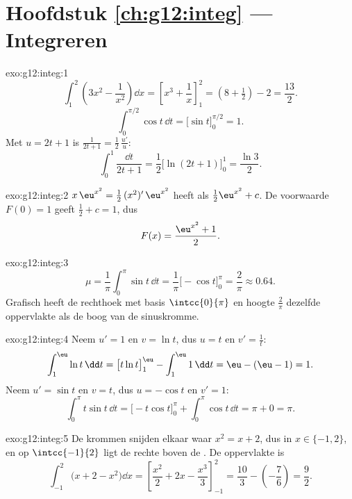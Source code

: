 \section*{Hoofdstuk \ref{ch:g12:integ} --- Integreren}

\begin{solution}{exo:g12:integ:1}
\[
\int_1^2 \left(3x^2 - \frac{1}{x^2}\right)\dd x
= \left[x^3 + \frac1x\right]_1^2 = \left(8 + \tfrac12\right) - 2 = \frac{13}{2}.
\]
\[
\int_0^{\pi/2} \cos t\,\dd t = \bigl[\sin t\bigr]_0^{\pi/2} = 1 .
\]
Met $u = 2t+1$ is $\frac{1}{2t+1} = \frac12\,\frac{u'}{u}$:
\[
\int_0^1 \frac{\dd t}{2t+1} = \frac12\bigl[\ln(2t+1)\bigr]_0^1
= \frac{\ln 3}{2}.
\]
\end{solution}

\begin{solution}{exo:g12:integ:2}
$x\,\eu^{x^2} = \frac12\,(x^2)'\,\eu^{x^2}$ heeft als 
$\frac12\eu^{x^2} + c$. De voorwaarde $F(0) = 1$ geeft $\frac12 + c = 1$,
dus
\[
F(x) = \frac{\eu^{x^2} + 1}{2}.
\]
\end{solution}

\begin{solution}{exo:g12:integ:3}
\[
\mu = \frac{1}{\pi}\int_0^\pi \sin t\,\dd t
= \frac{1}{\pi}\bigl[-\cos t\bigr]_0^\pi = \frac{2}{\pi} \approx 0.64 .
\]
Grafisch heeft de rechthoek met basis $\intcc{0}{\pi}$ en hoogte
$\frac{2}{\pi}$ dezelfde oppervlakte als de boog van de sinuskromme.
\end{solution}

\begin{solution}{exo:g12:integ:4}
Neem $u' = 1$ en $v = \ln t$, dus $u = t$ en $v' = \frac1t$:
\[
\int_1^{\eu} \ln t\,\dd t = \bigl[t\ln t\bigr]_1^{\eu} - \int_1^{\eu} 1\,\dd t
= \eu - (\eu - 1) = 1 .
\]
Neem $u' = \sin t$ en $v = t$, dus $u = -\cos t$ en $v' = 1$:
\[
\int_0^\pi t\sin t\,\dd t = \bigl[-t\cos t\bigr]_0^\pi + \int_0^\pi \cos t\,\dd t
= \pi + 0 = \pi .
\]
\end{solution}

\begin{solution}{exo:g12:integ:5}
De krommen snijden elkaar waar $x^2 = x + 2$, dus in $x \in \{-1, 2\}$, en op
$\intcc{-1}{2}$ ligt de rechte boven de . De oppervlakte is
\[
\int_{-1}^{2} \bigl(x + 2 - x^2\bigr)\dd x
= \left[\frac{x^2}{2} + 2x - \frac{x^3}{3}\right]_{-1}^{2}
= \frac{10}{3} - \left(-\frac{7}{6}\right) = \frac{9}{2}.
\]
\end{solution}


